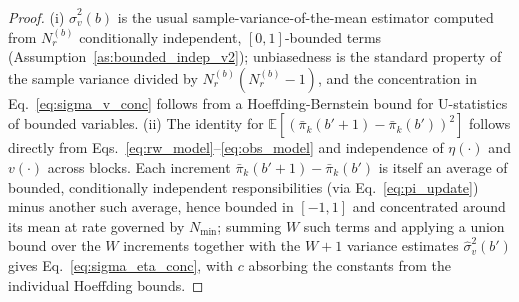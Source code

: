 ﻿\documentclass[12pt,a4paper]{article}
\newcommand{\E}{\mathbb{E}}
\begin{document}
\begin{proof}
	(i) $\hat\sigma_v^2(b)$ is the usual sample-variance-of-the-mean
	estimator computed from $N_r^{(b)}$ conditionally independent, $[0,1]$-bounded
	terms (Assumption~\ref{as:bounded_indep_v2}); unbiasedness is the
	standard property of the sample variance divided by $N_r^{(b)}(N_r^{(b)}-1)$,
	and the concentration in Eq.~\eqref{eq:sigma_v_conc} follows from a
	Hoeffding-Bernstein bound for U-statistics of bounded variables. (ii)
	The identity for $\E[(\bar\pi_k(b'+1)-\bar\pi_k(b'))^2]$ follows directly
	from Eqs.~\eqref{eq:rw_model}--\eqref{eq:obs_model} and independence of
	$\eta(\cdot)$ and $v(\cdot)$ across blocks. Each increment
	$\bar\pi_k(b'+1)-\bar\pi_k(b')$ is itself an average of bounded,
	conditionally independent responsibilities (via Eq.~\eqref{eq:pi_update})
	minus another such average, hence bounded in $[-1,1]$ and concentrated
	around its mean at rate governed by $N_{\min}$; summing $W$ such terms
	and applying a union bound over the $W$ increments together with the
	$W+1$ variance estimates $\hat\sigma_v^2(b')$ gives
	Eq.~\eqref{eq:sigma_eta_conc}, with $c$ absorbing the constants from the
	individual Hoeffding bounds.
\end{proof}
\end{document}
